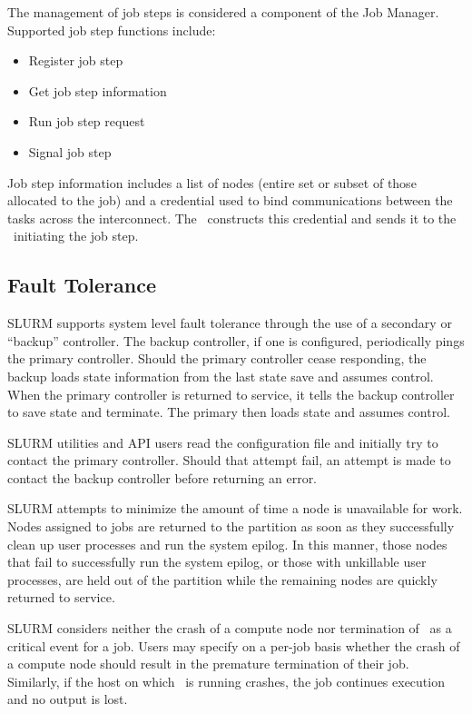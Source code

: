 \documentclass[10pt,onecolumn,times]{../common/llncs}
\begin{document}
{The management of job steps is considered a component of the Job Manager.
Supported job step functions include:
\begin{itemize}
\item Register job step
\item Get job step information
\item Run job step request
\item Signal job step
\end{itemize}

Job step information includes a list of nodes (entire set or subset of
those allocated to the job) and a credential used to bind communications
between the tasks across the interconnect. The \slurmctld\ constructs
this credential and sends it to the \srun\ initiating the job step.

\subsection{Fault Tolerance}
SLURM supports system level fault tolerance through the use of a secondary
or ``backup'' controller.  The backup controller, if one is configured,
periodically pings the primary controller.  Should the primary controller
cease responding, the backup loads state information from the last state
save and assumes control.  When the primary controller is returned to
service, it tells the backup controller to save state and terminate.
The primary then loads state and assumes control.

SLURM utilities and API users read the configuration file and initially try
to contact the primary controller.  Should that attempt fail, an attempt
is made to contact the backup controller before returning an error.

SLURM attempts to minimize the amount of time a node is unavailable
for work.  Nodes assigned to jobs are returned to the partition as
soon as they successfully clean up user processes and run the system
epilog.  In this manner,
those nodes that fail to successfully run the system epilog, or those
with unkillable user processes, are held out of the partition while
the remaining nodes are quickly returned to service.

SLURM considers neither the crash of a compute node nor termination
of \srun\ as a critical event for a job. Users may specify on a per-job
basis whether the crash of a compute node should result in the premature
termination of their job. Similarly, if the host on which \srun\ is
running crashes, the job continues execution and no output is lost.


}
\end{document}
